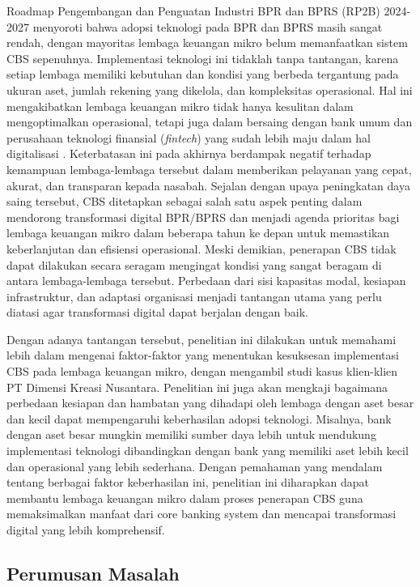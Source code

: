 \documentclass[journal,article,submit,pdftex,moreauthors]{Definitions/mdpi}
\begin{document}
    Roadmap Pengembangan dan Penguatan Industri BPR dan BPRS (RP2B) 2024-2027 \cite{OJK2024roadmap} menyoroti bahwa adopsi teknologi pada BPR dan BPRS masih sangat rendah, dengan mayoritas lembaga keuangan mikro belum memanfaatkan sistem CBS sepenuhnya. Implementasi teknologi ini tidaklah tanpa tantangan, karena setiap lembaga memiliki kebutuhan dan kondisi yang berbeda tergantung pada ukuran aset, jumlah rekening yang dikelola, dan kompleksitas operasional. Hal ini mengakibatkan lembaga keuangan mikro tidak hanya kesulitan dalam mengoptimalkan operasional, tetapi juga dalam bersaing dengan bank umum dan perusahaan teknologi finansial (\textit{fintech}) yang sudah lebih maju dalam hal digitalisasi \cite{Sitorus2023digital}. Keterbatasan ini pada akhirnya berdampak negatif terhadap kemampuan lembaga-lembaga tersebut dalam memberikan pelayanan yang cepat, akurat, dan transparan kepada nasabah. Sejalan dengan upaya peningkatan daya saing tersebut, CBS ditetapkan sebagai salah satu aspek penting dalam mendorong transformasi digital BPR/BPRS dan menjadi agenda prioritas bagi lembaga keuangan mikro dalam beberapa tahun ke depan untuk memastikan keberlanjutan dan efisiensi operasional. Meski demikian, penerapan CBS tidak dapat dilakukan secara seragam mengingat kondisi yang sangat beragam di antara lembaga-lembaga tersebut. Perbedaan dari sisi kapasitas modal, kesiapan infrastruktur, dan adaptasi organisasi menjadi tantangan utama yang perlu diatasi agar transformasi digital dapat berjalan dengan baik.

Dengan adanya tantangan tersebut, penelitian ini dilakukan untuk memahami lebih dalam mengenai faktor-faktor yang menentukan kesuksesan implementasi CBS pada lembaga keuangan mikro, dengan mengambil studi kasus klien-klien PT Dimensi Kreasi Nusantara. Penelitian ini juga akan mengkaji bagaimana perbedaan kesiapan dan hambatan yang dihadapi oleh lembaga dengan aset besar dan kecil dapat mempengaruhi keberhasilan adopsi teknologi. Misalnya, bank dengan aset besar mungkin memiliki sumber daya lebih untuk mendukung implementasi teknologi dibandingkan dengan bank yang memiliki aset lebih kecil dan operasional yang lebih sederhana. Dengan pemahaman yang mendalam tentang berbagai faktor keberhasilan ini, penelitian ini diharapkan dapat membantu lembaga keuangan mikro dalam proses penerapan CBS guna memaksimalkan manfaat dari core banking system dan mencapai transformasi digital yang lebih komprehensif.

\subsection{Perumusan Masalah}
\end{document}
